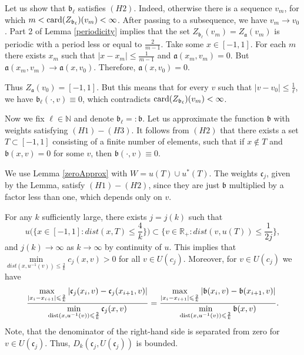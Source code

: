 \documentclass[12pt]{article}
\newcommand{\Real}{\mathbb R}
\newcommand{\Nat}{\mathbb N}
\newcommand{\abs}[1]{\left\vert#1\right\vert}
\renewcommand{\le}{\leqslant}
\newcommand{\card}{{\rm card}}
\newcommand{\dist}{\mathop{\rm dist}\nolimits}
\begin{document}
Let us show that $\mathfrak b_{\ell}$ satisfies $(H2)$.
Indeed, otherwise there is a sequence $v_m$, for which
$m < \card(Z_{\mathfrak b_{\ell}})(v_m) < \infty$.
After passing to a subsequence, we have $v_m \to v_0$.
Part 2 of Lemma \ref{periodicity} implies that the set $Z_{\mathfrak b_{\ell}}(v_m) = Z_{\mathfrak a}(v_m)$
is periodic with a period less or equal to $\frac{2}{m - 1}$.
Take some $x \in [-1, 1]$. For each $m$ there exists $x_m$ such that
$\abs{x - x_m} \le \frac{1}{m - 1}$ and $\mathfrak a(x_m, v_m) = 0$.
But $\mathfrak a(x_m, v_m) \to \mathfrak a(x, v_0)$.
Therefore, $\mathfrak a(x, v_0) = 0$.

Thus $Z_{\mathfrak a}(v_0) = [-1, 1]$.
But this means that for every $v$ such that $\abs{v - v_0} \le \frac{1}{\ell}$,
we have $\mathfrak b_{\ell}(\cdot, v) \equiv 0$,
which contradicts $\card(Z_{\mathfrak b_{\ell}})(v_m) < \infty$.

Now we fix $\ell \in \Nat$ and denote $\mathfrak b_{\ell} =: \mathfrak b$.
Let us approximate the function $\mathfrak b$ with weights satisfying $(H1)-(H3)$.
It follows from $(H2)$ that there exists a set $T \subset [-1, 1]$
consisting of a finite number of elements, such that
if $x \not\in T$ and $\mathfrak b(x, v) = 0$ for some $v$, then $\mathfrak b(\cdot, v) \equiv 0$.

We use Lemma \ref{zeroApprox} with $W = u(T) \cup u^*(T)$.
The weights $\mathfrak c_j$, given by the Lemma, satisfy $(H1)-(H2)$,
since they are just $\mathfrak b$ multiplied by a factor less than one, which depends only on $v$.

For any $k$ sufficiently large, there exists $j = j(k)$ such that
$$u\Big( \Big\{ x \in [-1, 1]: dist(x, T) \le \frac{4}{k} \Big\} \Big) \subset \Big\{ v \in \Real_+: dist(v, u(T)) \le \frac{1}{2j} \Big\},$$
and $j(k) \to \infty$ as $k \to \infty$ by continuity of $u$.
This implies that $\min\limits_{dist(x, u^{-1}(v)) \le \frac{2}{k}} c_j(x, v) > 0$
for all $v \in U(c_j)$.
Moreover, for $v \in U(c_j)$ we have
$$
\frac{\max\limits_{\abs{x_i - x_{i + 1}} \le \frac{2}{k}} \abs{\mathfrak c_j(x_i, v) - \mathfrak c_j(x_{i + 1}, v)}}
{\min\limits_{\dist(x, u^{-1}(v)) \le \frac{2}{k}} \mathfrak c_j(x, v)}
=\frac{\max\limits_{\abs{x_i - x_{i + 1}} \le \frac{2}{k}} \abs{\mathfrak b(x_i, v) - \mathfrak b(x_{i + 1}, v)}}
{\min\limits_{\dist(x, u^{-1}(v)) \le \frac{2}{k}} \mathfrak b(x, v)}.
$$
Note, that the denominator of the right-hand side is separated from zero for $v \in U(\mathfrak c_j)$.
Thus, $D_k(\mathfrak c_j, U(\mathfrak c_j))$ is bounded.
\end{document}
